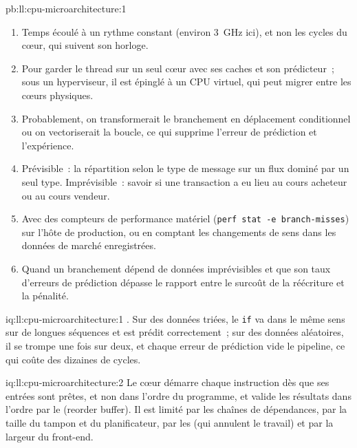 \begin{solution}{pb:ll:cpu-microarchitecture:1}
\begin{enumerate}
chiffre publié est un minimum sur du matériel nu.
\item Temps écoulé à un rythme constant (environ 3~GHz ici), et non les cycles du cœur, qui suivent son horloge.
\item Pour garder le thread sur un seul cœur avec ses caches et son prédicteur~; sous un hyperviseur, il est épinglé à un CPU virtuel,
qui peut migrer entre les cœurs physiques.
\item Probablement, on transformerait le branchement en déplacement conditionnel ou on vectoriserait la boucle, ce qui supprime l'erreur de prédiction et
l'expérience.
\item Prévisible~: la répartition selon le type de message sur un flux dominé par un seul type. Imprévisible~: savoir si une transaction a eu lieu au
cours acheteur ou au cours vendeur.
\item Avec des compteurs de performance matériel (\texttt{perf stat -e branch-misses}) sur l'hôte de production, ou en comptant
les changements de sens dans les données de marché enregistrées.
\item Quand un branchement dépend de données imprévisibles et que son taux d'erreurs de prédiction dépasse le rapport entre le surcoût
de la réécriture et la pénalité.
\end{enumerate}
\end{solution}

\begin{solution}{iq:ll:cpu-microarchitecture:1}
. Sur des données triées, le \texttt{if} va dans le même sens sur de longues séquences et est prédit correctement~; sur des
données aléatoires, il se trompe une fois sur deux, et chaque erreur de prédiction vide le pipeline, ce qui coûte des dizaines de cycles.
\end{solution}

\begin{solution}{iq:ll:cpu-microarchitecture:2}
Le cœur démarre chaque instruction dès que ses entrées sont prêtes, et non dans l'ordre du programme, et valide les résultats dans l'ordre par le
 (reorder buffer). Il est limité par les chaînes de dépendances, par la taille du tampon et du planificateur, par
les  (qui annulent le travail) et par la largeur du front-end.
\end{solution}

